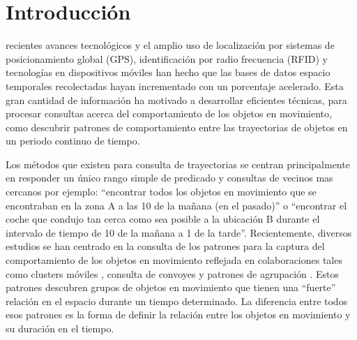 \section{Introducción}

 recientes avances tecnológicos y el amplio  uso de localización por sistemas de posicionamiento global (GPS),
identificación por radio frecuencia (RFID) y tecnologías en dispositivos móviles han hecho que las bases de datos
espacio temporales recolectadas hayan incrementado con un porcentaje acelerado. Esta gran cantidad de información
ha motivado a desarrollar eficientes técnicas, para procesar consultas acerca del comportamiento de los objetos en
movimiento, como descubrir patrones de comportamiento entre las trayectorias de objetos en un periodo continuo de tiempo. 

Los métodos que existen para consulta de trayectorias se centran principalmente en responder un único rango simple
de predicado  y consultas de vecinos mas cercanos   por ejemplo:  ``encontrar todos los objetos en movimiento que se
encontraban en la zona A a las 10 de la mañana (en el pasado)'' o ``encontrar el coche que condujo tan cerca como sea posible a
la ubicación B durante el intervalo de tiempo de 10 de la mañana a 1 de la tarde''.  Recientemente, diversos estudios se han centrado
en la consulta de los patrones para la captura del comportamiento de los objetos en movimiento reflejada en colaboraciones tales como
clusters móviles \cite{jensen2007continuous} \cite{kalnis2005discovering}, consulta de convoyes 
\cite{jeung2008discovery-1} y patrones de agrupación \cite{gudmundsson2006computing} \cite{benkert2008reporting}
\cite{vieira2009line}. Estos patrones descubren grupos de objetos en movimiento que tienen una ``fuerte'' relación en
el espacio durante un tiempo determinado. La diferencia entre todos esos patrones es la forma de definir 
la relación entre los objetos en movimiento y su duración en el tiempo. 

